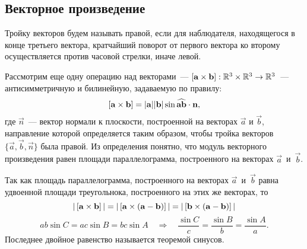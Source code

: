 \subsection{Векторное произведение}

Тройку векторов будем называть правой, если для наблюдателя, находящегося в конце третьего вектора, кратчайший поворот от первого вектора ко второму осуществляется против часовой стрелки, иначе левой.

Рассмотрим еще одну операцию над векторами~---  $\left[\mathbf{a} \times \mathbf{b}\right]: \mathbb{R}^3 \times \mathbb{R}^3 \rightarrow \mathbb{R}^3$~--- антисимметричную и билинейную, задаваемую по правилу:
\begin{equation}
	\left[\mathbf{a} \times \mathbf{b}\right] = |\mathbf{a}||\mathbf{b}| \sin \widehat{\mathbf{a}\mathbf{b}} \cdot \mathbf{n},
\end{equation}
где $\vec{n}$~--- вектор нормали к плоскости, построенной на векторах $\vec{a}$ и $\vec{b}$, направление которой определяется таким образом, чтобы тройка векторов $\{\vec{a}, \vec{b}, \vec{n} \}$ была правой. Из определения понятно, что модуль векторного произведения равен площади параллелограмма, построенного на векторах $\vec{a}$~и~$\vec{b}$.

Так как площадь параллелограмма, построенного на векторах $\vec{a}$~и~$\vec{b}$ равна удвоенной площади треугольнока, построенного на этих же векторах, то
\begin{equation}
	|\left[\mathbf{a} \times \mathbf{b}\right]| = |\left[\mathbf{a} \times \mathbf{(a - b)}\right] | = |\left[\mathbf{b} \times \mathbf{(a-b)}\right]|
\end{equation}
\begin{equation}
	a b \sin C = a c \sin B = b c \sin A \quad \Rightarrow \quad \frac{\sin C}{c} = \frac{\sin B}{b} = \frac{\sin A}{a}.
\end{equation}
Последнее двойное равенство называется теоремой синусов.

